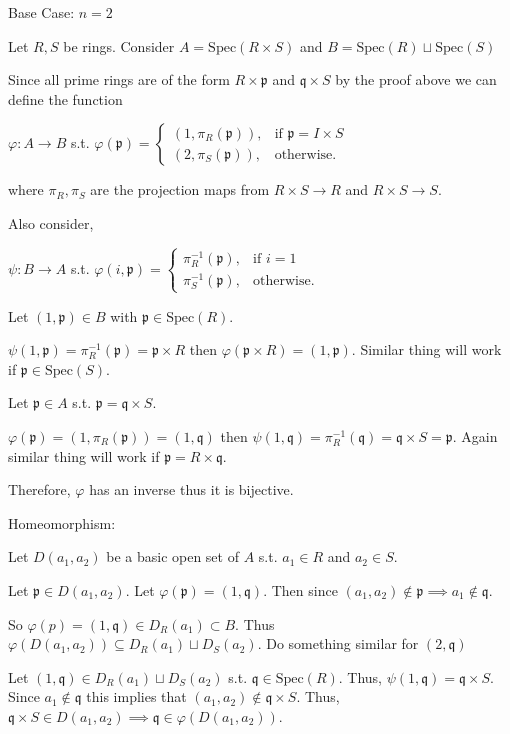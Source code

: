 \documentclass[12pt, letterpaper]{article}
\newcommand{\p}{\mathfrak{p}}
\renewcommand{\t}[1]{\text{#1}}
\begin{document}
\begin{problemproof}
    Base Case: $n=2$
    
    Let $R,S$ be rings. Consider $A=\t{Spec}(R \times S)$ and $B=\t{Spec}(R) \sqcup \t{Spec}(S)$

    Since all prime rings are of the form $R \times \p$ and  $\mathfrak{q} \times S$ by the proof above we can define the function

    $\varphi: A \to B$ s.t. $\varphi(\p)=\begin{cases}
        (1, \pi_R(\p)), & \t{if $\p=I \times S$}\\
        (2, \pi_S(\p)), & \t{otherwise}.
    \end{cases}$
    
    where $\pi_R,\pi_S$ are the projection maps from $R\times S \to R$ and $R \times S \to S$.

    Also consider,

    $\psi: B \to A$ s.t. $\varphi(i,\p)=\begin{cases}
        \pi_R^{-1}(\p), & \t{if $i = 1$}\\
        \pi_S^{-1}(\p), & \t{otherwise}.
    \end{cases}$

    Let $(1, \p) \in B$ with $\p \in \t{Spec}(R)$.

    $\psi(1,\p)=\pi_R^{-1}(\p)=\p \times R$ then $\varphi(\p \times R)=(1,\p)$. Similar thing will work if $\p \in \t{Spec}(S)$.

    Let $\p \in A$ s.t. $\p=\mathfrak{q} \times S$.

    $\varphi(\p)=(1,\pi_R(\p))=(1,\mathfrak{q})$ then $\psi(1,\mathfrak{q})=\pi_R^{-1}(\mathfrak{q})=\mathfrak{q} \times S = \p$. Again similar thing will work if $\p = R \times \mathfrak{q}$.

    Therefore, $\varphi$ has an inverse thus it is bijective.

    Homeomorphism:

    Let $D(a_1,a_2)$ be a basic open set of $A$ s.t. $a_1 \in R$ and $a_2 \in S$.
    
    Let $\p \in D(a_1,a_2)$. Let $\varphi(\p)=(1,\mathfrak{q})$. Then since $(a_1,a_2) \notin \p \implies a_1 \notin \mathfrak{q}$.

    So $\varphi(p)=(1,\mathfrak{q}) \in D_R(a_1) \subset B$. Thus $\varphi(D(a_1,a_2)) \subseteq D_R(a_1) \sqcup D_S(a_2)$. Do something similar for $(2,\mathfrak{q})$

    Let $(1,\mathfrak{q}) \in D_R(a_1) \sqcup D_S(a_2)$ s.t. $\mathfrak{q} \in \t{Spec}(R)$. Thus, $\psi(1,\mathfrak{q})=\mathfrak{q} \times S$. Since $a_1 \notin \mathfrak{q}$ this implies that $(a_1,a_2) \notin \mathfrak{q} \times S$. Thus, $\mathfrak{q} \times S \in D(a_1,a_2) \implies \mathfrak{q} \in \varphi(D(a_1,a_2))$.


\end{problemproof}
\end{document}
